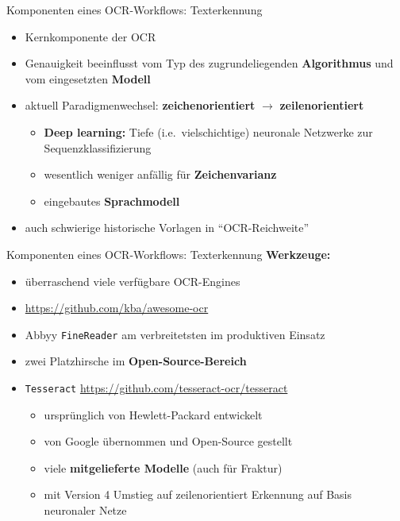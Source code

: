 \documentclass{bbawslides}
\begin{document}
\begin{bbawslide}{Komponenten eines OCR-Workflows: Texterkennung}
  \vspace*{7mm}%
  \centerslidestrue%
  \begin{itemize}
    \item Kernkomponente der OCR
    \item Genauigkeit beeinflusst vom Typ des zugrundeliegenden \textbf{Algorithmus} und vom eingesetzten \textbf{Modell}
    \item aktuell Paradigmenwechsel: \textbf{zeichenorientiert} $\rightarrow$ \textbf{zeilenorientiert}
    \begin{itemize} \small
      \item \textbf{Deep learning:} Tiefe (i.e.~vielschichtige) neuronale Netzwerke zur Sequenzklassifizierung 
      \item wesentlich weniger anfällig für \textbf{Zeichenvarianz}
      \item eingebautes \textbf{Sprachmodell}
    \end{itemize}
    \item auch schwierige historische Vorlagen in \enquote{OCR-Reichweite} 
  \end{itemize}
\end{bbawslide}

\begin{bbawslide}{Komponenten eines OCR-Workflows: Texterkennung}
  \vspace*{7mm}%
  \centerslidestrue%
  \textbf{Werkzeuge:}
  \begin{itemize}
    \item überraschend viele verfügbare OCR-Engines
    \item \url{https://github.com/kba/awesome-ocr}
    \item Abbyy \texttt{FineReader} am verbreitetsten im produktiven Einsatz
    \item zwei Platzhirsche im \textbf{Open-Source-Bereich}
    \item \texttt{Tesseract} \url{https://github.com/tesseract-ocr/tesseract}
    \begin{itemize}\small
      \item ursprünglich von Hewlett-Packard entwickelt
      \item von Google übernommen und Open-Source gestellt
      \item viele \textbf{mitgelieferte Modelle} (auch für Fraktur)
      \item mit Version 4 Umstieg auf zeilenorientiert Erkennung auf Basis neuronaler Netze
    \end{itemize}
  \end{itemize}
\end{bbawslide}
\end{document}
